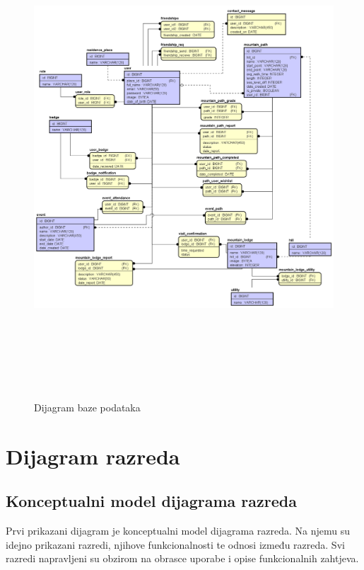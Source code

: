 				\begin{figure}[H]
					\includegraphics[scale=0.4, height=180mm]{slike/database.png} %
					\centering
					\caption{Dijagram baze podataka}
					\label{fig:dijagrambp}
				\end{figure}
			
			\eject
			
			
		\section{Dijagram razreda}
		
			\subsection{Konceptualni model dijagrama razreda}
			Prvi prikazani dijagram je konceptualni model dijagrama razreda. Na njemu su idejno prikazani razredi, njihove funkcionalnosti te odnosi između razreda. Svi razredi napravljeni su obzirom na obrasce uporabe i opise funkcionalnih zahtjeva.
		
